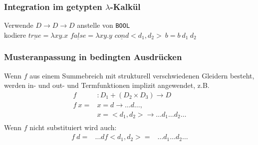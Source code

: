 \subsubsection*{Integration im getypten $\lambda$-Kalkül}
Verwende $D \rightarrow D \rightarrow D$ anstelle von \lstinline!BOOL!\\
kodiere $\underline{true} = \lambda xy.x $ $\underline{false} = \lambda xy.y$ %
$\underline{cond} <d_1, d_2> \ b = b \ d_1 \ d_2$

\subsubsection*{Musteranpassung in bedingten Ausdrücken}
Wenn $f$ aus einem Summebreich mit strukturell verschwiedenen Gleidern besteht, werden in- und out- und Termfunktionen implizit angewendet, z.B.\\
\begin{align*}
f&: D_1 + (D_2 \times D_3) \rightarrow D\\
f \ x = &x = d \rightarrow \dots d \dots, \\
& x = <d_1, d_2> \rightarrow \dots d_1 \dots d_2 \dots\\
\end{align*}
Wenn $f$ nicht substituiert wird auch: 
\begin{align*}
f \ d = & \dots d
f <d_1, d_2> = & \dots d_1 \dots d_2 \dots
\end{align*}

